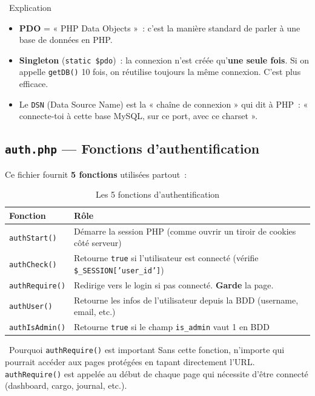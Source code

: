 \documentclass[12pt,a4paper]{article}
\begin{document}
\begin{conceptbox}{\faDatabase\ Explication}
\begin{itemize}
    \item \textbf{PDO} = « PHP Data Objects »~: c'est la manière standard de parler à une base de données en PHP.
    \item \textbf{Singleton} (\texttt{static \$pdo})~: la connexion n'est créée qu'\textbf{une seule fois}. Si on appelle \texttt{getDB()} 10 fois, on réutilise toujours la même connexion. C'est plus efficace.
    \item Le \texttt{DSN} (Data Source Name) est la « chaîne de connexion » qui dit à PHP~: « connecte-toi à cette base MySQL, sur ce port, avec ce charset ».
\end{itemize}
\end{conceptbox}

\subsection{\texttt{auth.php} --- Fonctions d'authentification}

Ce fichier fournit \textbf{5 fonctions} utilisées partout~:

\begin{table}[h!]
\centering
\begin{tabularx}{\textwidth}{lX}
    \toprule
    \textbf{Fonction} & \textbf{Rôle} \\
    \midrule
    \texttt{authStart()} & Démarre la session PHP (comme ouvrir un tiroir de cookies côté serveur) \\
    \texttt{authCheck()} & Retourne \texttt{true} si l'utilisateur est connecté (vérifie \texttt{\$\_SESSION['user\_id']}) \\
    \texttt{authRequire()} & Redirige vers le login si pas connecté. \textbf{Garde} la page. \\
    \texttt{authUser()} & Retourne les infos de l'utilisateur depuis la BDD (username, email, etc.) \\
    \texttt{authIsAdmin()} & Retourne \texttt{true} si le champ \texttt{is\_admin} vaut 1 en BDD \\
    \bottomrule
\end{tabularx}
\caption{Les 5 fonctions d'authentification}
\end{table}

\begin{warningbox}{\faExclamationTriangle\ Pourquoi \texttt{authRequire()} est important}
Sans cette fonction, n'importe qui pourrait accéder aux pages protégées en tapant directement l'URL. \texttt{authRequire()} est appelée au début de chaque page qui nécessite d'être connecté (dashboard, cargo, journal, etc.).
\end{warningbox}
\end{document}
